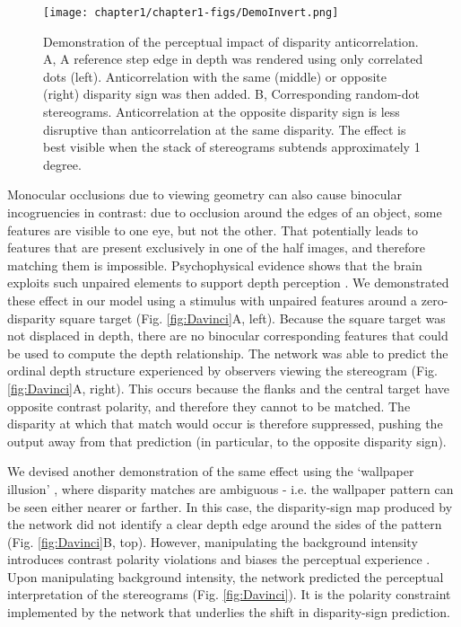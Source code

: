 \begin{figure}
  \centering
  \texttt{[image: chapter1/chapter1-figs/DemoInvert.png]}
  \caption[Perceptual impact of disparity anti-correlation.]{Demonstration of the perceptual impact of disparity anticorrelation. A, A reference step edge in depth was rendered using only correlated dots (left). Anticorrelation with the same (middle) or opposite (right) disparity sign was then added. B, Corresponding random-dot stereograms. Anticorrelation at the opposite disparity sign is less disruptive than anticorrelation at the same disparity. The effect is best visible when the stack of stereograms subtends approximately 1 degree.}
  \label{fig:DemoInvert}
\end{figure}

Monocular occlusions due to viewing geometry can also cause binocular incogruencies in contrast: due to occlusion around the edges of an object, some features are visible to one eye, but not the other. That potentially leads to features that are present exclusively in one of the half images, and therefore matching them is impossible. Psychophysical evidence shows that the brain exploits such unpaired elements to support depth perception \cite{Gillam:1988lo,Nakayama:1990fc}. We demonstrated these effect in our model using a stimulus with unpaired features around a zero-disparity square target (Fig. \ref{fig:Davinci}A, left). Because the square target was not displaced in depth, there are no binocular corresponding features that could be used to compute the depth relationship. The network was able to predict the ordinal depth structure experienced by observers viewing the stereogram (Fig. \ref{fig:Davinci}A, right). This occurs because the flanks and the central target have opposite contrast polarity, and therefore they cannot to be matched. The disparity at which that match would occur is therefore suppressed, pushing the output away from that prediction (in particular, to the opposite disparity sign).

We devised another demonstration of the same effect using the ‘wallpaper illusion’ \cite{Anderson:1994fk}, where disparity matches are ambiguous - i.e. the wallpaper pattern can be seen either nearer or farther. In this case, the disparity-sign map produced by the network did not identify a clear depth edge around the sides of the pattern (Fig. \ref{fig:Davinci}B, top). However, manipulating the background intensity introduces contrast polarity violations and biases the perceptual experience \cite{Anderson:1994fk}. Upon manipulating background intensity, the network predicted the perceptual interpretation of the stereograms (Fig. \ref{fig:Davinci}). It is the polarity constraint implemented by the network that underlies the shift in disparity-sign prediction. 

